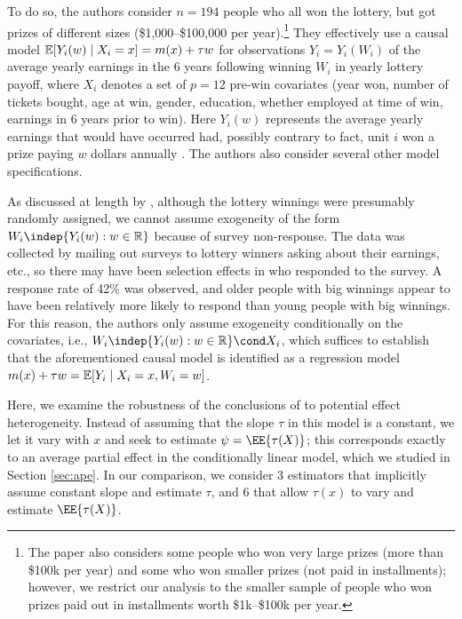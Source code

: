 \documentclass[aos,submission]{imsart}
\theoremstyle{plain}
\theoremstyle{remark}
\DeclarePairedDelimiter\set{\{}{\}}
\newcommand{\R}{\mathbb{R}}
\begin{document}
To do so, the authors consider $n = 194$ people who all won the lottery,
but got prizes of different sizes (\$1,000--\$100,000 per year).\footnote{The
paper also considers some people who won very large prizes (more than \$100k per year) and
some who won smaller prizes (not paid in installments); however, we restrict our analysis
to the smaller sample of people who won prizes paid out in installments worth \$1k--\$100k per year.}
They effectively use a causal model $\E[Y_i(w) \mid X_i=x] = m(x) + \tau w$
for observations $Y_i=Y_i(W_i)$ of the average yearly earnings in the 6 years following winning
$W_i$ in yearly lottery payoff, where $X_i$ denotes a set of $p = 12$ pre-win covariates
(year won, number of tickets bought, age at win, gender, education, whether
employed at time of win, earnings in 6 years prior to win). Here $Y_i(w)$
represents the average yearly earnings that would have occurred had, possibly contrary to fact,
unit $i$ won a prize paying $w$ dollars annually \citep[e.g.,][]{imbens2015causal}. 
The authors also consider several other model specifications.

As discussed at length by \citet*{imbens2001estimating}, although the lottery winnings
were presumably randomly assigned, we cannot assume exogeneity of the form
$W_i \indep \set{ Y_i(w) : w \in \R}$ because of survey non-response. The data was collected by
mailing out surveys to lottery winners asking about their earnings, etc., so
there may have been selection effects in who responded to the survey. 
A response rate of 42\% was observed, and older people with big 
winnings appear to have been relatively more likely to respond than young people with
big winnings. For this reason, the authors only assume exogeneity
conditionally on the covariates, i.e., $W_i \indep \set{ Y_i(w) : w \in \R} \cond X_i$,
which suffices to establish that the aforementioned causal model is identified 
as a regression model $m(x) + \tau w = \E[Y_i \mid X_i=x, W_i=w]$.

Here, we examine the robustness of the conclusions of \citet*{imbens2001estimating}
to potential effect heterogeneity. Instead of assuming that the slope $\tau$ in this model
 is a constant, we let it vary with $x$ and seek to estimate $\psi = \EE{\tau(X)}$;
this corresponds exactly to an average partial effect in the conditionally linear model, which we
studied in Section \ref{sec:ape}. In our comparison, we consider 3 estimators that implicitly
assume constant slope and estimate $\tau$, and 6 that allow
$\tau(x)$ to vary and estimate $\EE{\tau(X)}$.
\end{document}
